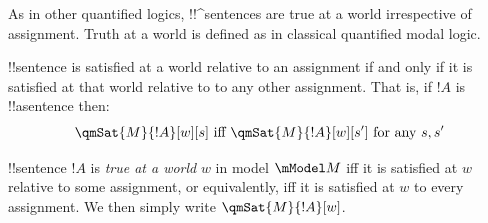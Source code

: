 \documentclass[../../../include/open-logic-section]{subfiles}
\begin{document}
\begin{defn}
\begin{enumerate}








\end{enumerate}
\end{defn}

As in other quantified logics, 
!!^{sentence}s are true at a world irrespective of assignment. 
Truth at a world is defined as in classical quantified modal logic. 

\begin{prop}
 !!{sentence} is satisfied at a world relative to an
assignment if and only if it is satisfied at that world relative to to
any other assignment. That is, if $!A$ is !!a{sentence} then:
$$\qmSat{M}{!A}[w][s]\text{ iff }\qmSat{M}{!A}[w][s']\text{ for any }s,s'$$
\end{prop}

\begin{defn}[truth-at-w]
 !!{sentence} $!A$ is \emph{true at a world} $w$
in model $\mModel M$ iff it is satisfied at $w$ relative to some assignment, 
or equivalently, iff it is satisfied at $w$ to every assignment.
We then simply write $\qmSat{M}{!A}[w]$. 
\end{defn}
\end{document}
